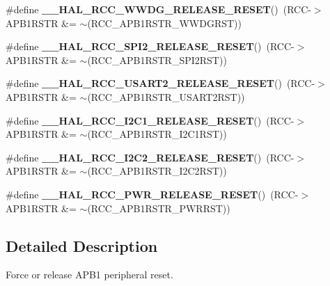\begin{DoxyCompactItemize}
\item 
\#define {\bfseries \+\_\+\+\_\+\+H\+A\+L\+\_\+\+R\+C\+C\+\_\+\+W\+W\+D\+G\+\_\+\+R\+E\+L\+E\+A\+S\+E\+\_\+\+R\+E\+S\+ET}()~(R\+CC-\/$>$A\+P\+B1\+R\+S\+TR \&= $\sim$(R\+C\+C\+\_\+\+A\+P\+B1\+R\+S\+T\+R\+\_\+\+W\+W\+D\+G\+R\+ST))\hypertarget{group___r_c_c___a_p_b1___force___release___reset_ga63fa37b173c2c1d9249389148f96e5f1}{}\label{group___r_c_c___a_p_b1___force___release___reset_ga63fa37b173c2c1d9249389148f96e5f1}

\item 
\#define {\bfseries \+\_\+\+\_\+\+H\+A\+L\+\_\+\+R\+C\+C\+\_\+\+S\+P\+I2\+\_\+\+R\+E\+L\+E\+A\+S\+E\+\_\+\+R\+E\+S\+ET}()~(R\+CC-\/$>$A\+P\+B1\+R\+S\+TR \&= $\sim$(R\+C\+C\+\_\+\+A\+P\+B1\+R\+S\+T\+R\+\_\+\+S\+P\+I2\+R\+ST))\hypertarget{group___r_c_c___a_p_b1___force___release___reset_gacb910fd0c3c5a27d020ef3df20fce4c7}{}\label{group___r_c_c___a_p_b1___force___release___reset_gacb910fd0c3c5a27d020ef3df20fce4c7}

\item 
\#define {\bfseries \+\_\+\+\_\+\+H\+A\+L\+\_\+\+R\+C\+C\+\_\+\+U\+S\+A\+R\+T2\+\_\+\+R\+E\+L\+E\+A\+S\+E\+\_\+\+R\+E\+S\+ET}()~(R\+CC-\/$>$A\+P\+B1\+R\+S\+TR \&= $\sim$(R\+C\+C\+\_\+\+A\+P\+B1\+R\+S\+T\+R\+\_\+\+U\+S\+A\+R\+T2\+R\+ST))\hypertarget{group___r_c_c___a_p_b1___force___release___reset_ga8baebf28a2739de5f3c5ef72519b9499}{}\label{group___r_c_c___a_p_b1___force___release___reset_ga8baebf28a2739de5f3c5ef72519b9499}

\item 
\#define {\bfseries \+\_\+\+\_\+\+H\+A\+L\+\_\+\+R\+C\+C\+\_\+\+I2\+C1\+\_\+\+R\+E\+L\+E\+A\+S\+E\+\_\+\+R\+E\+S\+ET}()~(R\+CC-\/$>$A\+P\+B1\+R\+S\+TR \&= $\sim$(R\+C\+C\+\_\+\+A\+P\+B1\+R\+S\+T\+R\+\_\+\+I2\+C1\+R\+ST))\hypertarget{group___r_c_c___a_p_b1___force___release___reset_ga87cc8c2107c1d0820cc1f7e2aeb1aeb9}{}\label{group___r_c_c___a_p_b1___force___release___reset_ga87cc8c2107c1d0820cc1f7e2aeb1aeb9}

\item 
\#define {\bfseries \+\_\+\+\_\+\+H\+A\+L\+\_\+\+R\+C\+C\+\_\+\+I2\+C2\+\_\+\+R\+E\+L\+E\+A\+S\+E\+\_\+\+R\+E\+S\+ET}()~(R\+CC-\/$>$A\+P\+B1\+R\+S\+TR \&= $\sim$(R\+C\+C\+\_\+\+A\+P\+B1\+R\+S\+T\+R\+\_\+\+I2\+C2\+R\+ST))\hypertarget{group___r_c_c___a_p_b1___force___release___reset_ga2fa8cc909b285813af86c253ec110356}{}\label{group___r_c_c___a_p_b1___force___release___reset_ga2fa8cc909b285813af86c253ec110356}

\item 
\#define {\bfseries \+\_\+\+\_\+\+H\+A\+L\+\_\+\+R\+C\+C\+\_\+\+P\+W\+R\+\_\+\+R\+E\+L\+E\+A\+S\+E\+\_\+\+R\+E\+S\+ET}()~(R\+CC-\/$>$A\+P\+B1\+R\+S\+TR \&= $\sim$(R\+C\+C\+\_\+\+A\+P\+B1\+R\+S\+T\+R\+\_\+\+P\+W\+R\+R\+ST))\hypertarget{group___r_c_c___a_p_b1___force___release___reset_gaaa5a340d38d50e508243f48bbb47dd32}{}\label{group___r_c_c___a_p_b1___force___release___reset_gaaa5a340d38d50e508243f48bbb47dd32}

\end{DoxyCompactItemize}


\subsection{Detailed Description}
Force or release A\+P\+B1 peripheral reset. 


